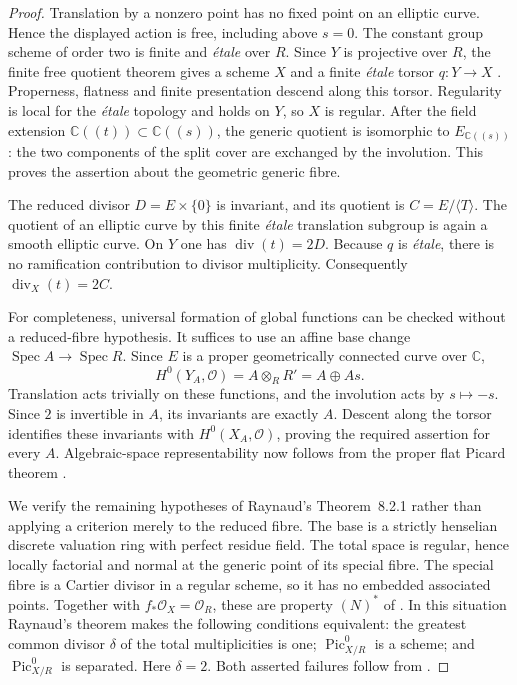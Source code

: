 \documentclass[11pt,a4paper]{article}
\theoremstyle{definition}
\newcommand{\Spec}{\operatorname{Spec}}
\newcommand{\C}{\mathbb C}
\begin{document}
\begin{proof}
Translation by a nonzero point has no fixed point on an elliptic curve. Hence the displayed action is free, including above $s=0$. The constant group scheme of order two is finite and \emph{\'etale} over $R$. Since $Y$ is projective over $R$, the finite free quotient theorem gives a scheme $X$ and a finite \emph{\'etale} torsor $q:Y\to X$ \cite[Lemma~66.14.2]{StacksQuotient}. Properness, flatness and finite presentation descend along this torsor. Regularity is local for the \emph{\'etale} topology and holds on $Y$, so $X$ is regular. After the field extension $\C((t))\subset\C((s))$, the generic quotient is isomorphic to $E_{\C((s))}$: the two components of the split cover are exchanged by the involution. This proves the assertion about the geometric generic fibre.

The reduced divisor $D=E\times\{0\}$ is invariant, and its quotient is $C=E/\langle T\rangle$. The quotient of an elliptic curve by this finite \emph{\'etale} translation subgroup is again a smooth elliptic curve. On $Y$ one has $\operatorname{div}(t)=2D$. Because $q$ is \emph{\'etale}, there is no ramification contribution to divisor multiplicity. Consequently $\operatorname{div}_X(t)=2C$.

For completeness, universal formation of global functions can be checked without a reduced-fibre hypothesis. It suffices to use an affine base change $\Spec A\to\Spec R$. Since $E$ is a proper geometrically connected curve over $\C$,
\[
 H^0(Y_A,\mathcal O)=A\otimes_R R'=A\oplus As.
\]
Translation acts trivially on these functions, and the involution acts by $s\mapsto-s$. Since $2$ is invertible in $A$, its invariants are exactly $A$. Descent along the torsor identifies these invariants with $H^0(X_A,\mathcal O)$, proving the required assertion for every $A$. Algebraic-space representability now follows from the proper flat Picard theorem \cite[Proposition~99.11.8]{StacksPicard}.

We verify the remaining hypotheses of Raynaud's Theorem~8.2.1 rather than applying a criterion merely to the reduced fibre. The base is a strictly henselian discrete valuation ring with perfect residue field. The total space is regular, hence locally factorial and normal at the generic point of its special fibre. The special fibre is a Cartier divisor in a regular scheme, so it has no embedded associated points. Together with $f_*\mathcal O_X=\mathcal O_R$, these are property $(N)^*$ of \cite[Definition~6.1.4, p.~48]{RaynaudPicard}. In this situation Raynaud's theorem makes the following conditions equivalent: the greatest common divisor $\delta$ of the total multiplicities is one; $\operatorname{Pic}^0_{X/R}$ is a scheme; and $\operatorname{Pic}^0_{X/R}$ is separated. Here $\delta=2$. Both asserted failures follow from \cite[Theorem~8.2.1, pp.~66--67]{RaynaudPicard}.
\end{proof}
\end{document}
